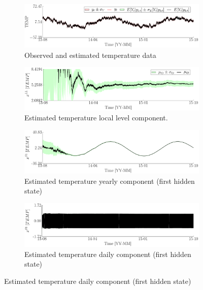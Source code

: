 \begin{figure}[h!]
\ContinuedFloat
\begin{subfigure}{\linewidth}
\includegraphics[width=0.9\linewidth]{./docfigs/Example_DISPTEMPSIM/optim_param_default_initialhiddenstate/TEMP_ObservedPredicted.pdf} 
\caption{Observed and estimated temperature data}
\end{subfigure}
\begin{subfigure}{\linewidth}
\includegraphics[width=0.9\linewidth]{./docfigs/Example_DISPTEMPSIM/optim_param_default_initialhiddenstate/TEMP_LL_1.pdf} 
\caption{Estimated temperature local level component.}
\end{subfigure}
\begin{subfigure}{\linewidth}
\includegraphics[width=0.9\linewidth]{./docfigs/Example_DISPTEMPSIM/optim_param_default_initialhiddenstate/TEMP_S1_2.pdf} 
\caption{Estimated temperature yearly component (first hidden state)}
\end{subfigure}
\begin{subfigure}{\linewidth}
\includegraphics[width=0.9\linewidth]{./docfigs/Example_DISPTEMPSIM/optim_param_default_initialhiddenstate/TEMP_S1_4.pdf} 
\caption{Estimated temperature daily component (first hidden state)}

\end{subfigure}
\end{figure}
